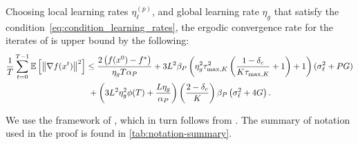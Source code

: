 \begin{theorem}
    Choosing local learning rates $\eta_{\ell}^{(p)}$, and global learning rate $\eta_g$ that satisfy the condition~\eqref{eq:condition_learning_rates}, the ergodic convergence rate for the iterates of \algname{} is upper bound by the following:
    \begin{multline*}
        \frac{1}{T} \sum_{t=0}^{T-1} \mathbb{E}\left[\left\lVert\nabla f(x^t)\right\rVert^2\right] \leq \frac{2\left(f(x^0) - f^* \right)}{\eta_g T \alpha_P} + 3 L^2 \beta_P \left( \eta^2_g \tau_{\max,K}^2 \left( \frac{1-\delta_c}{K \tau_{\max, K}} + 1 \right) + 1 \right)  (\sigma_{\ell}^2 + PG) \\
        {} +  \left( 3L^2 \eta_g^2 \phi(T) + \frac{L \eta_g}{\alpha_P} \right) \left(\frac{2-\delta_c}{K}\right)\beta_P \left(\sigma_{\ell}^2 + 4G\right).
    \end{multline*}
\end{theorem}
We use the framework of \cite{FedBuff}, which in turn follows from \cite{perturbedIterate}.
The summary of notation used in the proof is found in \cref{tab:notation-summary}.

